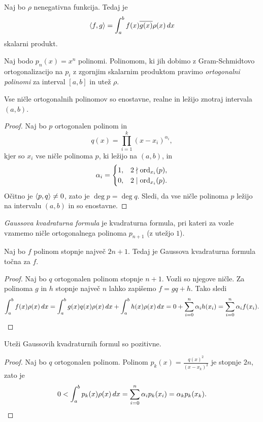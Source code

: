 \begin{trditev}
Naj bo $\rho$ nenegativna funkcija. Tedaj je
\[
\left\langle f, g\right\rangle = \int_a^b f(x) \overline{g(x)} \rho(x)\,dx
\]
skalarni produkt.
\end{trditev}

\obvs

\begin{definicija}
Naj bodo $p_n(x) = x^n$ polinomi. Polinomom, ki jih dobimo z
Gram-Schmidtovo ortogonalizacijo na $p_i$ z zgornjim skalarnim
produktom pravimo
\emph{ortogonalni polinomi} za interval
$[a, b]$ in utež $\rho$.
\end{definicija}

\begin{lema}
Vse ničle ortogonalnih polinomov so enostavne, realne in ležijo
znotraj intervala $(a,b)$.
\end{lema}

\begin{proof}
Naj bo $p$ ortogonalen polinom in
\[
q(x) = \prod_{i=1}^k (x - x_i)^{\alpha_i},
\]
kjer so $x_i$ vse ničle polinoma $p$, ki ležijo na $(a,b)$, in
\[
\alpha_i =
\begin{cases}
1, & 2 \nmid \operatorname{ord}_{x_i}(p), \\
0, & 2 \mid \operatorname{ord}_{x_i}(p).
\end{cases}
\]
Očitno je $\left\langle p, q\right\rangle \ne 0$, zato je $\deg p = \deg q$. Sledi,
da vse ničle polinoma $p$ ležijo na intervalu $(a, b)$ in so
enostavne.
\end{proof}

\begin{definicija}
\emph{Gaussova kvadraturna formula}
je kvadraturna formula, pri kateri za vozle vzamemo ničle
ortogonalnega polinoma $p_{n+1}$ (z utežjo $1$).
\end{definicija}

\begin{trditev}
Naj bo $f$ polinom stopnje največ $2n+1$. Tedaj je Gaussova
kvadraturna formula točna za $f$.
\end{trditev}

\begin{proof}
Naj bo $q$ ortogonalen polinom stopnje $n+1$. Vozli so njegove
ničle. Za polinoma $g$ in $h$ stopnje največ $n$ lahko zapišemo
$f = gq + h$. Tako sledi
\[
\int_a^b f(x) \rho(x)\,dx =
\int_a^b g(x) q(x) \rho(x)\,dx + \int_a^b h(x) \rho(x)\,dx =
0 + \sum_{i=0}^n \alpha_i h(x_i) =
\sum_{i=0}^n \alpha_i f(x_i). \qedhere
\]
\end{proof}

\begin{lema}
Uteži Gaussovih kvadraturnih formul so pozitivne.
\end{lema}

\begin{proof}
Naj bo $q$ ortogonalen polinom. Polinom
$p_k(x) = \frac{q(x)^2}{(x - x_k)^2}$ je stopnje $2n$, zato je
\[
0 < \int_a^b p_k(x) \rho(x)\,dx =
\sum_{i=0}^n \alpha_i p_k(x_i) =
\alpha_k p_k(x_k). \qedhere
\]
\end{proof}
